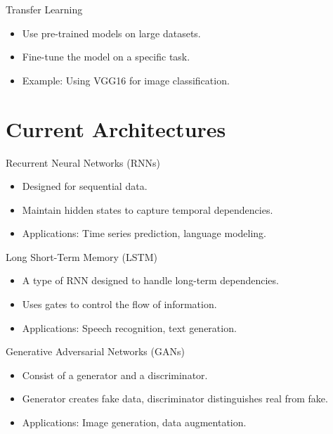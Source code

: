 \documentclass{beamer}
\begin{document}
\begin{frame}{Transfer Learning}
    \begin{itemize}
        \item Use pre-trained models on large datasets.
        \item Fine-tune the model on a specific task.
        \item Example: Using VGG16 for image classification.
    \end{itemize}
\end{frame}

\section{Current Architectures}
\begin{frame}{Recurrent Neural Networks (RNNs)}
    \begin{itemize}
        \item Designed for sequential data.
        \item Maintain hidden states to capture temporal dependencies.
        \item Applications: Time series prediction, language modeling.
    \end{itemize}
\end{frame}

\begin{frame}{Long Short-Term Memory (LSTM)}
    \begin{itemize}
        \item A type of RNN designed to handle long-term dependencies.
        \item Uses gates to control the flow of information.
        \item Applications: Speech recognition, text generation.
    \end{itemize}
\end{frame}

\begin{frame}{Generative Adversarial Networks (GANs)}
    \begin{itemize}
        \item Consist of a generator and a discriminator.
        \item Generator creates fake data, discriminator distinguishes real from fake.
        \item Applications: Image generation, data augmentation.
    \end{itemize}
\end{frame}
\end{document}

